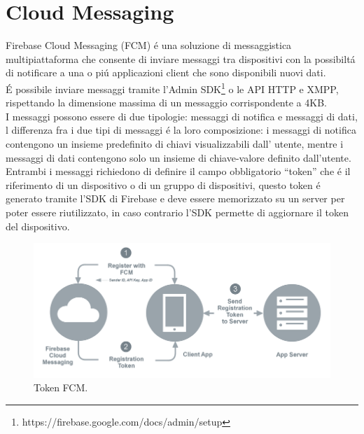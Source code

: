 \newpage
\section{Cloud Messaging}                 %
Firebase Cloud Messaging (FCM) \'e una soluzione di messaggistica multipiattaforma che consente di inviare messaggi tra dispositivi con la possibilt\'a di notificare a una o pi\'u applicazioni client che sono disponibili nuovi dati.\\
\'E possibile inviare messaggi tramite l'Admin SDK\footnote{https://firebase.google.com/docs/admin/setup} o le API HTTP e XMPP, rispettando la dimensione massima di un messaggio corrispondente a 4KB.\\
I messaggi possono essere di due tipologie: messaggi di notifica e messaggi di dati, l differenza fra i due tipi di messaggi \'e la loro composizione: i messaggi di notifica contengono un insieme predefinito di chiavi visualizzabili dall' utente, mentre i messaggi di dati contengono solo un insieme di chiave-valore definito dall'utente.\\
Entrambi i messaggi richiedono di definire il campo obbligatorio ``token'' che \'e il riferimento di un dispositivo o di un gruppo di dispositivi, questo token \'e generato tramite l'SDK di Firebase e deve essere memorizzato su un server per poter essere riutilizzato, in caso contrario l'SDK permette di aggiornare il token del dispositivo.

\begin{figure}[!hb]
  \centering
  \includegraphics[width=1\textwidth]{immagini/fcm_token.png}
  \caption{Token FCM.}
  \label{fig:Token FCM}
\end{figure}

